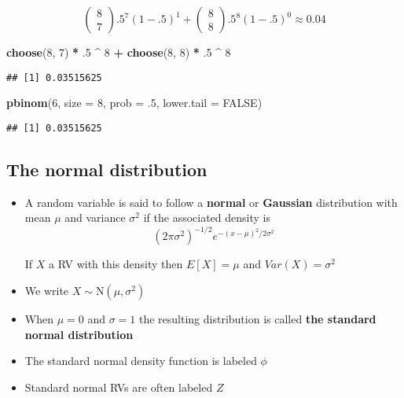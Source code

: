 \documentclass[]{article}
\newenvironment{Shaded}{\begin{snugshade}}{\end{snugshade}}
\newcommand{\DataTypeTok}[1]{\textcolor[rgb]{0.13,0.29,0.53}{#1}}
\newcommand{\DecValTok}[1]{\textcolor[rgb]{0.00,0.00,0.81}{#1}}
\newcommand{\FloatTok}[1]{\textcolor[rgb]{0.00,0.00,0.81}{#1}}
\newcommand{\KeywordTok}[1]{\textcolor[rgb]{0.13,0.29,0.53}{\textbf{#1}}}
\newcommand{\NormalTok}[1]{#1}
\newcommand{\OperatorTok}[1]{\textcolor[rgb]{0.81,0.36,0.00}{\textbf{#1}}}
\newcommand{\OtherTok}[1]{\textcolor[rgb]{0.56,0.35,0.01}{#1}}
\newcommand{\StringTok}[1]{\textcolor[rgb]{0.31,0.60,0.02}{#1}}
\begin{document}
\[\left(\begin{array}{c}8 \\ 7\end{array}\right) .5^{7}(1-.5)^{1}+\left(\begin{array}{c}8 \\ 8\end{array}\right) .5^{8}(1-.5)^{0} \approx 0.04\]

\begin{Shaded}
\begin{Highlighting}[]
\KeywordTok{choose}\NormalTok{(}\DecValTok{8}\NormalTok{, }\DecValTok{7}\NormalTok{) }\OperatorTok{*}\StringTok{ }\FloatTok{.5} \OperatorTok{^}\StringTok{ }\DecValTok{8} \OperatorTok{+}\StringTok{ }\KeywordTok{choose}\NormalTok{(}\DecValTok{8}\NormalTok{, }\DecValTok{8}\NormalTok{) }\OperatorTok{*}\StringTok{ }\FloatTok{.5} \OperatorTok{^}\StringTok{ }\DecValTok{8} 
\end{Highlighting}
\end{Shaded}

\begin{verbatim}
## [1] 0.03515625
\end{verbatim}

\begin{Shaded}
\begin{Highlighting}[]
\KeywordTok{pbinom}\NormalTok{(}\DecValTok{6}\NormalTok{, }\DataTypeTok{size =} \DecValTok{8}\NormalTok{, }\DataTypeTok{prob =} \FloatTok{.5}\NormalTok{, }\DataTypeTok{lower.tail =} \OtherTok{FALSE}\NormalTok{)}
\end{Highlighting}
\end{Shaded}

\begin{verbatim}
## [1] 0.03515625
\end{verbatim}

\hypertarget{the-normal-distribution}{%
\subsection{The normal distribution}\label{the-normal-distribution}}

\begin{itemize}
\item
  A random variable is said to follow a \textbf{normal} or
  \textbf{Gaussian} distribution with mean \(\mu\) and variance
  \(\sigma^2\) if the associated density is
  \[(2\pi \sigma^2)^{-1/2}e^{-(x - \mu)^2/2\sigma^2}\]

  If \(X\) a RV with this density then \(E[X] = \mu\) and
  \(Var(X) = \sigma^2\)
\item
  We write \(X\sim \mbox{N}(\mu, \sigma^2)\)
\item
  When \(\mu = 0\) and \(\sigma = 1\) the resulting distribution is
  called \textbf{the standard normal distribution}
\item
  The standard normal density function is labeled \(\phi\)
\item
  Standard normal RVs are often labeled \(Z\)
\end{itemize}
\end{document}
